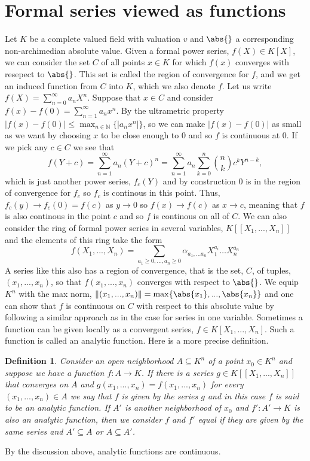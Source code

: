 \documentclass{article}
\newtheorem{definition}{Definition}[section]
\newcommand{\mbb}[1]{\mathbb{#1}}
\numberwithin{equation}{section}
\begin{document}
\section{Formal series viewed as functions}
Let $K$ be a complete valued field with valuation $v$ and $\abs{}$ a corresponding non-archimedian absolute value. Given a formal power series, $f(X) \in K[X]$, we can consider the set $C$ of all points $x \in K$ for which $f(x)$ converges with resepect to $\abs{}$. This set is called the region of convergence for $f$, and we get an induced function from $C$ into $K$, which we also denote $f$. Let us write $f(X) = \sum_{n=0}^\infty a_n X^n$. Suppose that $x \in C$ and consider $f(x) - f(0) = \sum_{n=1}^\infty a_n x^n$. By the ultrametric property $|f(x) - f(0)| \leq \max_{n \in \mbb N} \{ |a_n x^n| \}$, so we can make $|f(x) - f(0)|$ as small as we want by choosing $x$ to be close enough to 0 and so $f$ is continuous at 0. If we pick any $c \in C$ we see that
$$f(Y + c) = \sum_{n=1}^\infty a_n (Y + c)^n = \sum_{n=1}^\infty a_n \sum_{k = 0}^n \binom{n}{k} c^{k}Y^{n-k},$$
which is just another power series, $f_c(Y)$ and by construction $0$ is in the region of convergence for $f_c$ so $f_c$ is continous in this point. Thus, $f_c(y) \to f_c(0) = f(c)$ as $y \to 0$ so $f(x) \to f(c)$ as $x \to c$, meaning that $f$ is also continous in the point $c$ and so $f$ is continous on all of $C$. We can also consider the ring of formal power series in several variables, $K[[X_1, ..., X_n]]$ and the elements of this ring take the form
$$f(X_1, ..., X_n) = \sum_{a_1 \geq 0, \ldots, a_n \geq 0} \alpha_{a_1, \ldots a_n} X_1^{a_i} \ldots X_n^{a_n}$$
A series like this also has a region of convergence, that is the set, $C$, of tuples, $(x_1, ..., x_n)$, so that $f(x_1, ..., x_n)$ converges with respect to $\abs{}$. We equip $K^n$ with the max norm, $\|(x_1, ..., x_n)\| = \max \{\abs{x_1}, ..., \abs{x_n} \}$ and one can show that $f$ is continuous on $C$ with respect to this absolute value by following a similar approach as in the case for series in one variable. Sometimes a function can be given locally as a convergent series, $f \in K[X_1, ..., X_n]$. Such a function is called an analytic function. Here is a more precise definition.
\begin{definition}
   Consider an open neighborhood $A \subseteq K^n$ of a point $x_0 \in K^n$ and suppose we have a function $f : A \to K$. If there is a series $g \in K[[X_1, ..., X_n]]$ that converges on $A$ and $g(x_1, ..., x_n) = f(x_1, ..., x_n)$ for every $(x_1, ..., x_n) \in A$ we say that $f$ is given by the series $g$ and in this case $f$ is said to be an analytic function. If $A'$ is another neighborhood of $x_0$ and $f' : A' \to K$ is also an analytic function, then we consider $f$ and $f'$ equal if they are given by the same series and $A' \subseteq A$ or $A \subseteq A'$.
\end{definition}
By the discussion above, analytic functions are continuous.
\end{document}
